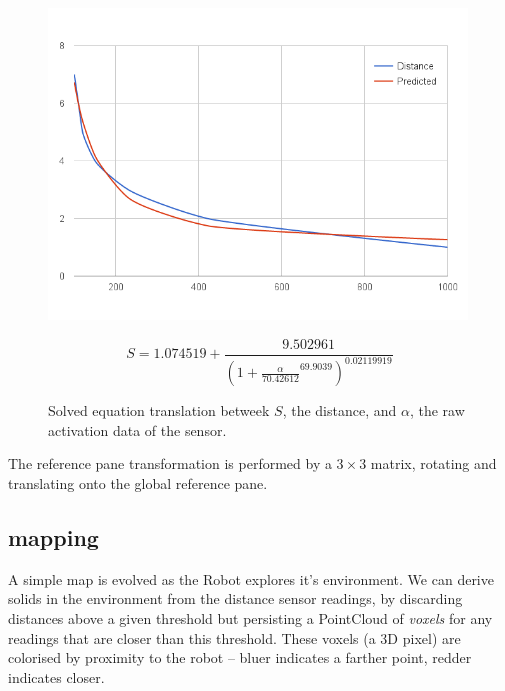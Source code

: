 \documentclass[11pt, a4paper]{article}
\begin{document}
\begin{figure}[H]
  \begin{center}
    \includegraphics[width=30em]{../assets/plots/sensor-equation.png}
  \end{center}
  \begin{equation}
    S = 1.074519 + 
    \frac{9.502961}
         {(1 + \frac{\alpha}{70.42612}^{69.9039})^{0.02119919}}
  \end{equation}
  \caption{Solved equation translation betweek $S$, the distance, and $\alpha$, 
    the raw activation data of the sensor.}
\end{figure}

The reference pane transformation is performed by a ${3\times3}$ matrix, rotating and translating
onto the global reference pane.

\newpage
\subsection{mapping}

A simple map is evolved as the Robot explores it's environment. We can derive solids in the environment
from the distance sensor readings, by discarding distances above a given threshold but persisting a
PointCloud of \textit{voxels} for any readings that are closer than this threshold. These voxels (a 3D pixel)
are colorised by proximity to the robot -- bluer indicates a farther point, redder indicates closer.
\end{document}
